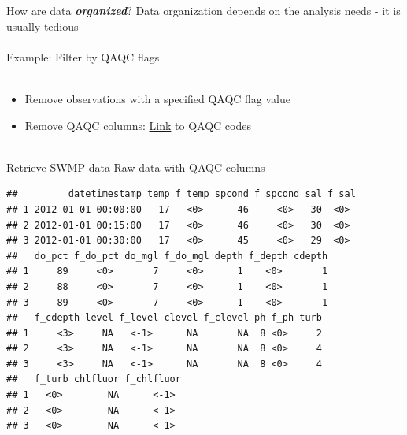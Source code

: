 \documentclass[serif]{beamer}\usepackage[]{graphicx}\usepackage[]{color}
\makeatletter
\newenvironment{kframe}{%
 \def\at@end@of@kframe{}%
 \ifinner\ifhmode%
  \def\at@end@of@kframe{\end{minipage}}%
  \begin{minipage}{\columnwidth}%
 \fi\fi%
 \def\FrameCommand##1{\hskip\@totalleftmargin \hskip-\fboxsep
 \colorbox{shadecolor}{##1}\hskip-\fboxsep
     \hskip-\linewidth \hskip-\@totalleftmargin \hskip\columnwidth}%
 \MakeFramed {\advance\hsize-\width
   \@totalleftmargin\z@ \linewidth\hsize
   \@setminipage}}%
 {\par\unskip\endMakeFramed%
 \at@end@of@kframe}
\newenvironment{knitrout}{}{} %
\newcommand{\Bigtxt}[1]{\textbf{\textit{#1}}}
\makeatother
\begin{document}
\begin{frame}[fragile,t]{How are data \Bigtxt{organized}?}
Data organization depends on the analysis needs - it is usually tedious \\~\\
Example: Filter by QAQC flags\\~\\
\begin{itemize}
\item Remove observations with a specified QAQC flag value
\item Remove QAQC columns: \href{http://cdmo.baruch.sc.edu/data/qaqc.cfm}{Link} to QAQC codes \\~\\
\end{itemize}
\centerline{}
\end{frame}

\begin{frame}{Retrieve SWMP data}
Raw data with QAQC columns
\begin{knitrout}\small
{}\color{fgcolor}\begin{kframe}
\begin{verbatim}
##         datetimestamp temp f_temp spcond f_spcond sal f_sal
## 1 2012-01-01 00:00:00   17   <0>      46     <0>   30  <0> 
## 2 2012-01-01 00:15:00   17   <0>      46     <0>   30  <0> 
## 3 2012-01-01 00:30:00   17   <0>      45     <0>   29  <0> 
##   do_pct f_do_pct do_mgl f_do_mgl depth f_depth cdepth
## 1     89     <0>       7     <0>      1    <0>       1
## 2     88     <0>       7     <0>      1    <0>       1
## 3     89     <0>       7     <0>      1    <0>       1
##   f_cdepth level f_level clevel f_clevel ph f_ph turb
## 1     <3>     NA   <-1>      NA       NA  8 <0>     2
## 2     <3>     NA   <-1>      NA       NA  8 <0>     4
## 3     <3>     NA   <-1>      NA       NA  8 <0>     4
##   f_turb chlfluor f_chlfluor
## 1   <0>        NA      <-1> 
## 2   <0>        NA      <-1> 
## 3   <0>        NA      <-1>
\end{verbatim}
\end{kframe}
\end{knitrout}
\end{frame}
\end{document}
